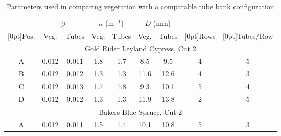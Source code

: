 \documentclass[12pt]{article}
\begin{document}
\begin{table}[!]
    \centering
    \caption{Parameters used in comparing vegetation with a comparable tube bank configuration}
    \label{tab:tube_parameters}
    \begin{tabular}{|c|c|c|c|c|c|c|c|c|}
    \hline
                                 & \multicolumn{2}{|c|}{$\beta$} & \multicolumn{2}{|c|}{$\kappa$ (m$^{-1}$)} & \multicolumn{2}{|c|}{$D$ (mm)} &                             &                                  \\ \cline{2-7}
    \raisebox{1.5ex}[0pt]{Pos.}  & Veg.             & Tubes      & Veg.                 & Tubes              & Veg.              & Tubes      & \raisebox{1.5ex}[0pt]{Rows} & \raisebox{1.5ex}[0pt]{Tubes/Row} \\ \hline \hline
    \multicolumn{9}{|c|}{Gold Rider Leyland Cypress, Cut 2}                                                                                                                                                    \\ \hline
    A                            & 0.012            & 0.011      & 1.8                  & 1.7                & 8.5               & 9.5        & 4                           & 5                                \\ \hline
    B                            & 0.012            & 0.012      & 1.3                  & 1.3                & 11.6              & 12.6       & 4                           & 3                                \\ \hline
    C                            & 0.012            & 0.013      & 1.7                  & 1.8                & 9.3               & 10.1       & 5                           & 4                                \\ \hline
    D                            & 0.012            & 0.012      & 1.3                  & 1.3                & 11.9              & 13.8       & 2                           & 5                                \\ \hline
        \multicolumn{9}{|c|}{Bakers Blue Spruce, Cut 2}                                                                                                                                                    \\ \hline
    A                            & 0.012            & 0.011      & 1.5                  & 1.4                & 10.1              & 10.8       & 5                           & 3                                \\ \hline

\end{tabular}
\end{table}
\end{document}
